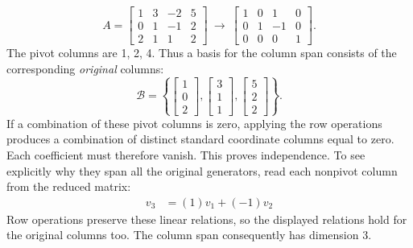 \[A=\left[\begin{array}{rrrr}1&3&-2&5\\0&1&-1&2\\2&1&1&2\end{array}\right]\ \longrightarrow\ \left[\begin{array}{rrrr}1&0&1&0\\0&1&-1&0\\0&0&0&1\end{array}\right].\]
The pivot columns are 1, 2, 4. Thus a basis for the column span consists of the corresponding \emph{original} columns:
\[\mathcal B=\left\{\left[\begin{array}{r}1\\0\\2\end{array}\right],\left[\begin{array}{r}3\\1\\1\end{array}\right],\left[\begin{array}{r}5\\2\\2\end{array}\right]\right\}.\]
If a combination of these pivot columns is zero, applying the row operations produces a combination of distinct standard coordinate columns equal to zero. Each coefficient must therefore vanish. This proves independence. To see explicitly why they span all the original generators, read each nonpivot column from the reduced matrix:
\[\begin{aligned}v_{3}&=(1)v_{1}+(-1)v_{2}\end{aligned}\]
Row operations preserve these linear relations, so the displayed relations hold for the original columns too. The column span consequently has dimension $3$.

